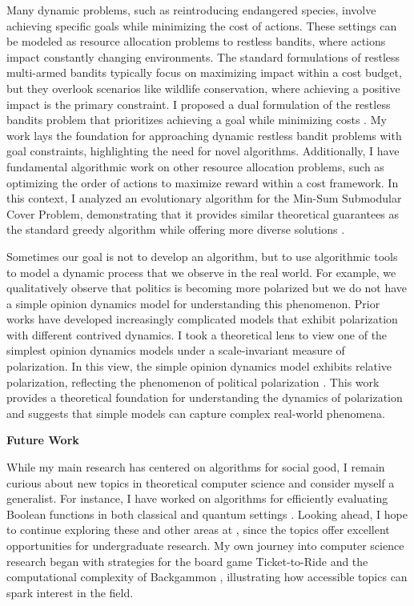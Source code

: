 \documentclass[11pt]{article}
\begin{document}
{Many dynamic problems, such as reintroducing endangered species, involve achieving specific goals while minimizing the cost of actions. These settings can be modeled as resource allocation problems to restless bandits, where actions impact constantly changing environments. The standard formulations of restless multi-armed bandits typically focus on maximizing impact within a cost budget, but they overlook scenarios like wildlife conservation, where achieving a positive impact is the primary constraint. I proposed a dual formulation of the restless bandits problem that prioritizes achieving a goal while minimizing costs \cite{witter2024minimizing}. My work lays the foundation for approaching dynamic restless bandit problems with goal constraints, highlighting the need for novel algorithms. Additionally, I have fundamental algorithmic work on other resource allocation problems, such as optimizing the order of actions to maximize reward within a cost framework. In this context, I analyzed an evolutionary algorithm for the Min-Sum Submodular Cover Problem, demonstrating that it provides similar theoretical guarantees as the standard greedy algorithm while offering more diverse solutions \cite{hellerstein2022local}.

Sometimes our goal is not to develop an algorithm, but to use algorithmic tools to model a dynamic process that we observe in the real world. For example, we qualitatively observe that politics is becoming more polarized but we do not have a simple opinion dynamics model for understanding this phenomenon. Prior works have developed increasingly complicated models that exhibit polarization with different contrived dynamics. I took a theoretical lens to view one of the simplest opinion dynamics models under a scale-invariant measure of polarization. In this view, the simple opinion dynamics model exhibits relative polarization, reflecting the phenomenon of political polarization \cite{musco2022quantify}. This work provides a theoretical foundation for understanding the dynamics of polarization and suggests that simple models can capture complex real-world phenomena.

\begin{center}
{\large \textbf{Future Work}}
\end{center}

While my main research has centered on algorithms for social good, I remain curious about new topics in theoretical computer science and consider myself a generalist. For instance, I have worked on algorithms for efficiently evaluating Boolean functions in both classical \cite{hellerstein2022adaptivity} and quantum settings \cite{czekanski2023robust,kimmel2021query,delorenzo2019applications}. Looking ahead, I hope to continue exploring these and other areas at \school, since the topics offer excellent opportunities for undergraduate research. My own journey into computer science research began with strategies for the board game Ticket-to-Ride \cite{witter2020applications} and the computational complexity of Backgammon \cite{witter2021backgammon}, illustrating how accessible topics can spark interest in the field.

}
\end{document}
